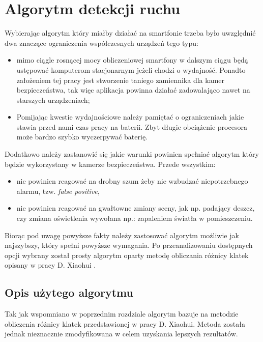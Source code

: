 \chapter{Algorytm detekcji ruchu}
\label{cha:algorytm detekcji ruchu}

Wybierając algorytm który miałby działać na smartfonie trzeba było uwzględnić dwa znaczące ograniczenia współczesnych urządzeń tego typu:
\begin{itemize}
	\item mimo ciągle rosnącej mocy obliczeniowej smartfony w dalszym ciągu będą ustępować komputerom stacjonarnym jeżeli chodzi o wydajność. Ponadto założeniem tej pracy jest stworzenie taniego zamiennika dla kamer bezpieczeństwa, tak więc aplikacja powinna działać zadowalająco nawet na starszych urządzeniach;
	\item Pomijając kwestie wydajnościowe należy pamiętać o ograniczeniach jakie stawia przed nami czas pracy na baterii. Zbyt długie obciążenie procesora może bardzo szybko wyczerpywać baterię.
\end{itemize}

Dodatkowo należy zastanowić się jakie warunki powinien spełniać algorytm który będzie wykorzystany w kamerze bezpieczeństwa. Przede wszystkim:
\begin{itemize}
	\item nie powinien reagować na drobny szum żeby nie wzbudzać niepotrzebnego alarmu, tzw. {\it false positive},
	\item nie powinien reagować na gwałtowne zmiany sceny, jak np. padający deszcz, czy zmiana oświetlenia wywołana np.: zapaleniem światła w pomieszczeniu.
\end{itemize}

Biorąc pod uwagę powyższe fakty należy zastosować algorytm możliwie jak najszybszy, który spełni powyższe wymagania. Po przeanalizowaniu dostępnych opcji wybrany został prosty algorytm oparty metodę obliczania różnicy klatek opisany w pracy D. Xiaohui \cite{Motiondet}.


\section{Opis użytego algorytmu}
\label{sec:użyty algorytm}

Tak jak wspomniano w poprzednim rozdziale algorytm bazuje na metodzie obliczenia różnicy klatek przedstawionej w pracy D. Xiaohui\cite{Motiondet}. Metoda została jednak nieznacznie zmodyfikowana w celem uzyskania lepszych rezultatów. 

